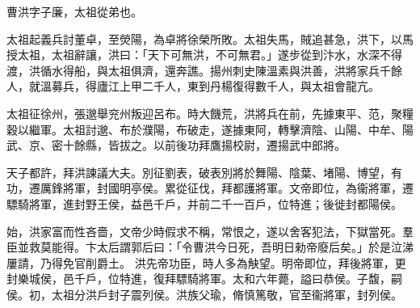 \begin{pinyinscope}
 
 
 曹洪字子廉，太祖從弟也。
 
 
 太祖起義兵討董卓，至熒陽，為卓將徐榮所敗。太祖失馬，賊追甚急，洪下，以馬授太祖，太祖辭讓，洪曰：「天下可無洪，不可無君。」遂步從到汴水，水深不得渡，洪循水得船，與太祖俱濟，還奔譙。揚州刺史陳溫素與洪善，洪將家兵千餘人，就溫募兵，得廬江上甲二千人，東到丹楊復得數千人，與太祖會龍亢。
 
 
 
 
 太祖征徐州，張邈舉兖州叛迎呂布。時大饑荒，洪將兵在前，先據東平、范，聚糧穀以繼軍。太祖討邈、布於濮陽，布破走，遂據東阿，轉擊濟陰、山陽、中牟、陽武、京、密十餘縣，皆拔之。以前後功拜鷹揚校尉，遷揚武中郎將。
 
 
 
 
 天子都許，拜洪諫議大夫。別征劉表，破表別將於舞陽、陰葉、堵陽、博望，有功，遷厲鋒將軍，封國明亭侯。累從征伐，拜都護將軍。文帝即位，為衞將軍，遷驃騎將軍，進封野王侯，益邑千戶，并前二千一百戶，位特進；後徙封都陽侯。
 
 
始，洪家富而性吝嗇，文帝少時假求不稱，常恨之，遂以舍客犯法，下獄當死。羣臣並救莫能得。卞太后謂郭后曰：「令曹洪今日死，吾明日勑帝廢后矣。」於是泣涕屢請，乃得免官削爵土。
 洪先帝功臣，時人多為觖望。明帝即位，拜後將軍，更封樂城侯，邑千戶，位特進，復拜驃騎將軍。太和六年薨，謚曰恭侯。子馥，嗣侯。初，太祖分洪戶封子震列侯。洪族父瑜，脩慎篤敬，官至衞將軍，封列侯。
 
 
\end{pinyinscope}